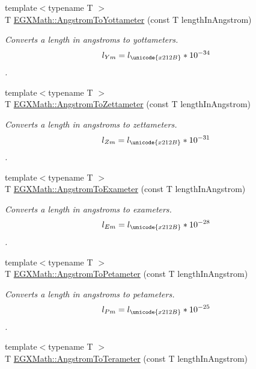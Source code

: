 \begin{DoxyCompactItemize}
{\footnotesize template$<$typename T $>$ }\\T \mbox{\hyperlink{group___e_g_x_math-_conversions-_length_conversions-_non-_s_i-_angstrom-_s_i_gae57ab83be8b18be2436ced646312c17f}{E\+G\+X\+Math\+::\+Angstrom\+To\+Yottameter}} (const T length\+In\+Angstrom)
\begin{DoxyCompactList}\small\item\em Converts a length in angstroms to yottameters. \[ l_{Ym}=l_{\unicode{x212B}} * 10^{-34} \]. \end{DoxyCompactList}\item 
{\footnotesize template$<$typename T $>$ }\\T \mbox{\hyperlink{group___e_g_x_math-_conversions-_length_conversions-_non-_s_i-_angstrom-_s_i_ga0af804446e88f9b27f2e278727a5a120}{E\+G\+X\+Math\+::\+Angstrom\+To\+Zettameter}} (const T length\+In\+Angstrom)
\begin{DoxyCompactList}\small\item\em Converts a length in angstroms to zettameters. \[ l_{Zm}=l_{\unicode{x212B}} * 10^{-31} \]. \end{DoxyCompactList}\item 
{\footnotesize template$<$typename T $>$ }\\T \mbox{\hyperlink{group___e_g_x_math-_conversions-_length_conversions-_non-_s_i-_angstrom-_s_i_gac419ce36b1288ba8547e669af6b5dd75}{E\+G\+X\+Math\+::\+Angstrom\+To\+Exameter}} (const T length\+In\+Angstrom)
\begin{DoxyCompactList}\small\item\em Converts a length in angstroms to exameters. \[ l_{Em}=l_{\unicode{x212B}} * 10^{-28} \]. \end{DoxyCompactList}\item 
{\footnotesize template$<$typename T $>$ }\\T \mbox{\hyperlink{group___e_g_x_math-_conversions-_length_conversions-_non-_s_i-_angstrom-_s_i_gafef0064a5934d807bed8bc6e8c9dd048}{E\+G\+X\+Math\+::\+Angstrom\+To\+Petameter}} (const T length\+In\+Angstrom)
\begin{DoxyCompactList}\small\item\em Converts a length in angstroms to petameters. \[ l_{Pm}=l_{\unicode{x212B}} * 10^{-25} \]. \end{DoxyCompactList}\item 
{\footnotesize template$<$typename T $>$ }\\T \mbox{\hyperlink{group___e_g_x_math-_conversions-_length_conversions-_non-_s_i-_angstrom-_s_i_ga4571315b1da0976784c024a676ebfa43}{E\+G\+X\+Math\+::\+Angstrom\+To\+Terameter}} (const T length\+In\+Angstrom)

\end{DoxyCompactItemize}
